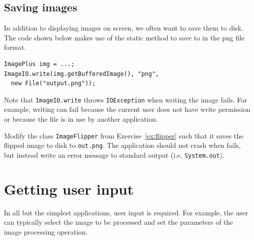 \documentclass{book}
\begin{document}
\subsection{Saving images}
In addition to displaying images on screen, we often want to save them to disk. The code shown below makes use of the static method  to save  to  in the png file format.
\begin{lstlisting}
ImagePlus img = ...;
ImageIO.write(img.getBufferedImage(), "png", 
  new File("output.png"));
\end{lstlisting}
Note that \texttt{ImageIO.write} throws \texttt{IOException} when writing the image fails. For example, writing can fail because the current user does not have write permission or because the file is in use by another application.

\begin{exercise}\label{ex:imageflipper2}
Modify the class \texttt{ImageFlipper} from Exercise~\ref{ex:flipper} such that it saves the flipped image to disk to \texttt{out.png}. The application should not crash when  fails, but instead write an error message to standard output (i.e.  \texttt{System.out}).
\end{exercise}

\section{Getting user input}
In all but the simplest applications, user input is required. For example, the user can typically select the image to be processed and set the parameters of the image processing operation.
\end{document}
